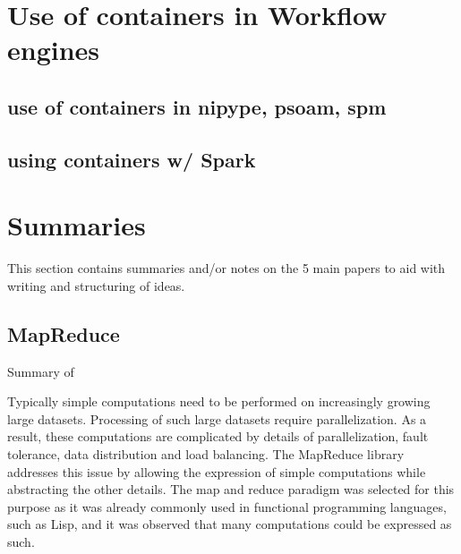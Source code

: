 \documentclass{report}
\begin{document}
\chapter{Use of containers in Workflow engines}
	\section{use of containers in nipype, psoam, spm}
	\section{using containers w/ Spark}

\chapter{Summaries}

This section contains summaries and/or notes on the 5 main papers to aid with writing and structuring of ideas.
\section{MapReduce}
Summary of ~\cite{mapred}

Typically simple computations need to be performed on increasingly growing large datasets. 
Processing of such large datasets require parallelization. As a result, these computations are 
complicated by details of parallelization, fault tolerance, data distribution and load balancing. The 
MapReduce library addresses this issue by allowing the expression of simple computations while 
abstracting the other details. The map and reduce paradigm was selected for this purpose as it 
was already commonly used in functional programming languages, such as Lisp, and it was 
observed that many computations could be expressed as such.
\end{document}
